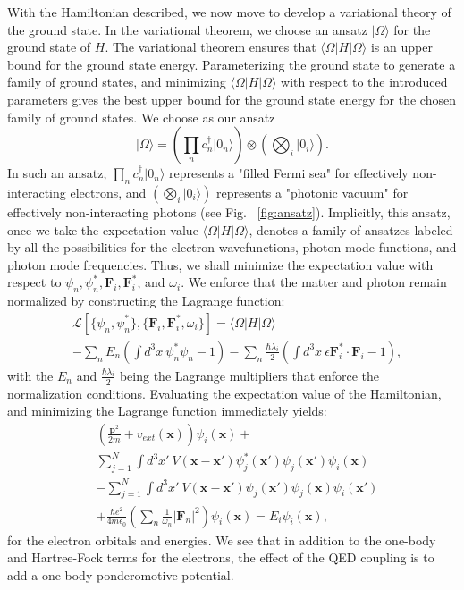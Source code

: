 \documentclass[aps,prl,twocolumn,
	groupedaddress,superscriptaddress,
	amsfonts,amssymb,amsmath,floatfix,
	citeautoscript]{revtex4-1}
\begin{document}
With the Hamiltonian described, we now move to develop a variational theory of the ground state. In the variational theorem, we choose an ansatz $|\Omega\rangle$ for the ground state of $H$. The variational theorem ensures that $\langle \Omega|H|\Omega\rangle$ is an upper bound for the ground state energy. Parameterizing the ground state to generate a family of ground states, and minimizing $\langle \Omega|H|\Omega\rangle$ with respect to the introduced parameters gives the best upper bound for the ground state energy for the chosen family of ground states.  We choose as our ansatz
\begin{equation}
|\Omega\rangle = \left( \prod\limits_n c_n^{\dagger}|0_n\rangle\right) \otimes \left(\bigotimes_i|0_i\rangle\right).
\label{eq:ansatz}
\end{equation}
In such an ansatz, $\prod\limits_n c_n^{\dagger}|0_n\rangle$ represents a "filled Fermi sea" for effectively non-interacting electrons, and $\left(\bigotimes_i|0_i\rangle\right)$ represents a "photonic vacuum" for effectively non-interacting photons (see Fig. ~\ref{fig:ansatz}). Implicitly, this ansatz, once we take the expectation value $\langle \Omega|H|\Omega\rangle$, denotes a family of ansatzes labeled by all the possibilities for the electron wavefunctions,  photon mode functions, and photon mode frequencies. Thus, we shall minimize the expectation value with respect to $\psi_n, \psi_n^*, \mathbf{F}_i, \mathbf{F}_i^*$, and $\omega_i$.  We enforce that the matter and photon remain normalized by constructing the Lagrange function:
\begin{align}
&\mathcal{L}[\{ \psi_n,\psi_n^* \},\{ \mathbf{F}_i,\mathbf{F}_i^*,\omega_i \}] = \langle \Omega |H|\Omega\rangle \\
&- \sum_n E_n\left(\int d^3x ~\psi_n^*\psi_n - 1 \right) - \sum_n \frac{\hbar\lambda_i}{2}\left(\int d^3x ~\epsilon\mathbf{F}_i^*\cdot\mathbf{F}_i - 1 \right),\nonumber
\end{align}
with the $E_n$ and $\frac{\hbar\lambda_i}{2}$ being the Lagrange multipliers that enforce the normalization conditions. Evaluating the expectation value of the Hamiltonian, and minimizing the Lagrange function  immediately yields:
\begin{align}
&\left(\frac{\mathbf{p}^2}{2m}+v_{ext}(\mathbf{x}) \right)\psi_i(\mathbf{x}) + \nonumber \\ &\sum\limits_{j=1}^N \int d^3x' ~ V(\mathbf{x}-\mathbf{x}')\psi^*_j(\mathbf{x}')\psi_j(\mathbf{x}')\psi_i(\mathbf{x}) \nonumber \\ & - \sum\limits_{j=1}^N \int d^3x' ~ V(\mathbf{x}-\mathbf{x}')\psi_j(\mathbf{x}')\psi_j(\mathbf{x})\psi_i(\mathbf{x}')  \nonumber \\ &+ \frac{\hbar e^2}{4m\epsilon_0}\left(\sum_n \frac{1}{\omega_n}|\mathbf{F}_n|^2\right)\psi_i(\mathbf{x})   = E_i\psi_i(\mathbf{x}),
\label{eq:mhf-electron}
\end{align}
for the electron orbitals and energies. We see that in addition to the one-body and Hartree-Fock terms for the electrons, the effect of the QED coupling is to add a one-body ponderomotive potential. %
\end{document}
